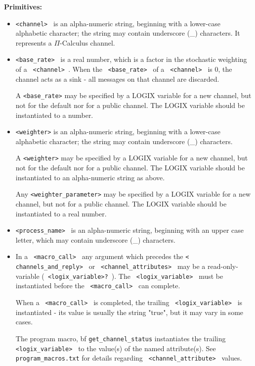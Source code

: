 \noindent
{\bf\Large Primitives:}

\begin{itemize}
\item
\verb+<channel> + is an alpha-numeric string, beginning with a lower-case
alphabetic character; the string may contain underscore (\_) characters.
It represents a $\Pi$-Calculus channel.

\item
\verb+<base_rate> + is a real number, which is a factor in the
stochastic  weighting of a \verb+ <channel> +.  When the
\verb+ <base_rate> + of a \verb+ <channel> + \linebreak is 0, the
channel acts as a sink - all messages on that channel are discarded.

\noindent
A \verb+<base_rate>+ may be specified by a LOGIX variable for a new channel,
but not for the default nor for a public channel.  The LOGIX variable
should be instantiated to a number.

\item
\verb+<weighter>+ is an alpha-numeric string, beginning with a lower-case
alphabetic character; the string may contain underscore (\_)
characters.

\noindent
A \verb+<weighter>+ may be specified by a LOGIX variable for a new channel,
but not for the default nor for a public channel.  The LOGIX variable
should be instantiated to an alpha-numeric string as above.

\noindent
Any \verb+<weighter_parameter>+ may be specified by a
LOGIX variable for a new channel, but not for a public channel.
The LOGIX variable should be instantiated to a real number.

\item
\verb+<process_name> + is an alpha-numeric string, beginning with an
upper case letter, which may contain underscore (\_) characters.

\item
In a \verb+ <macro_call> + any argument which precedes the
\verb+< channels_and_reply> + 
or \verb+ <channel_attributes> + may be a read-only-variable
(\verb+ <logix_variable>? +).  The \verb+ <logix_variable> + must be
instantiated before the \verb+ <macro_call> + can complete.

\noindent
When a \verb+ <macro_call> + is completed, the trailing
\verb+ <logix_variable> + is instantiated - its value is usually the
string "true", but it may vary in some cases.

\noindent
The program macro, {bf \verb+get_channel_status+} instantiates the trailing
\verb+ <logix_variable> + to the value(s) of the named attribute(s).  See 
\verb+program_macros.txt+ for details regarding
\verb+ <channel_attribute> + values.


\end{itemize}
